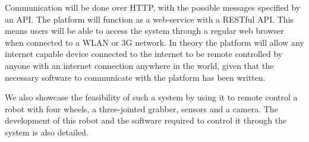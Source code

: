 Communication will be done over HTTP, with the possible messages specified by an API.
The platform will function as a web-service with a RESTful API. %
This means users will be able to access the system through a regular web browser when connected to a WLAN or 3G network.
In theory the platform will allow any internet capable device connected to the internet to be remote controlled by anyone with an internet connection anywhere in the world, given that the necessary software to communicate with the platform has been written.

We also showcase the feasibility of such a system by using it to remote control a robot with four wheels, a three-jointed grabber, sensors and a camera.
The development of this robot and the software required to control it through the system is also detailed.
